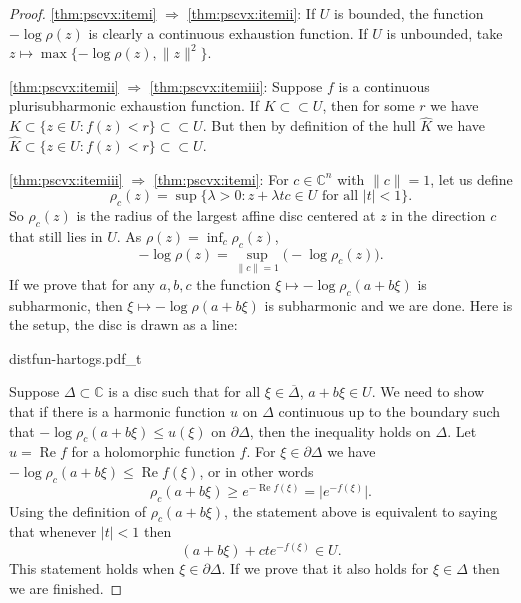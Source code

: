 \documentclass[12pt,openany]{book}
\renewcommand{\Re}{\operatorname{Re}}
\newcommand{\sabs}[1]{\lvert {#1} \rvert}
\newcommand{\snorm}[1]{\lVert {#1} \rVert}
\newcommand{\babs}[1]{\bigl\lvert {#1} \bigr\rvert}
\newcommand{\C}{{\mathbb{C}}}
\newcommand{\D}{{\mathbb{D}}}
\theoremstyle{plain}
\theoremstyle{remark}
\theoremstyle{definition}
\theoremstyle{exercise}
\theoremstyle{example}
\begin{document}
\begin{proof}
\eqref{thm:pscvx:itemi}
$\Rightarrow$
\eqref{thm:pscvx:itemii}:
If $U$ is bounded,
the function $-\log \rho(z)$ is clearly a continuous exhaustion function.
If $U$ is unbounded, take 
$z \mapsto \max \{ -\log \rho(z) , \snorm{z}^2 \}$.

\eqref{thm:pscvx:itemii}
$\Rightarrow$
\eqref{thm:pscvx:itemiii}:
Suppose $f$ is a continuous plurisubharmonic exhaustion function.
If $K \subset \subset U$, then for some $r$ we have
$K \subset \{ z \in U : f(z) < r \} \subset \subset U$.
But then by definition of the hull $\widehat{K}$ we have
$\widehat{K} \subset \{ z \in U : f(z) < r \} \subset \subset U$.

\eqref{thm:pscvx:itemiii}
$\Rightarrow$
\eqref{thm:pscvx:itemi}:
For $c \in \C^n$ with $\snorm{c}=1$, let us define
\begin{equation*}
\rho_c(z) =
\sup \{ \lambda > 0 : z+ \lambda t c \in U \text{ for all $\sabs{t} <
1$} \} .
\end{equation*}
So $\rho_c(z)$ is the radius of the largest affine disc centered at $z$
in the direction $c$ that still lies in $U$.
As $\rho(z) = \inf_c \rho_c(z)$,
\begin{equation*}
- \log \rho(z) = \sup_{\snorm{c}=1} \bigl(-\log \rho_c(z)\bigr) .
\end{equation*}
If we prove that for any $a, b, c$ the function $\xi \mapsto -\log \rho_c(a+b\xi)$ is
subharmonic, then $\xi \mapsto - \log \rho(a+b\xi)$ is subharmonic and we are done.
Here is the setup, the disc is drawn as a line:

\begin{center}
{distfun-hartogs.pdf_t}
\end{center}

Suppose $\Delta \subset \C$ is a disc such that for all $\xi \in
\overline{\Delta}$, $a+b\xi \in U$.  We need to show that if there is a
harmonic function $u$ on $\Delta$ continuous up to the boundary such
that $- \log \rho_c(a+b\xi) \leq u(\xi)$ on $\partial \Delta$, then
the inequality holds on $\Delta$.  Let $u = \Re f$ for a holomorphic
function $f$.
For $\xi \in \partial \Delta$ we have  $- \log \rho_c(a+b\xi) \leq \Re
f(\xi)$,
or in other words
\begin{equation*}
\rho_c(a+b\xi) \geq e^{-\Re f(\xi)} = \babs{e^{-f(\xi)}}.
\end{equation*}
Using the definition of $\rho_c(a+b\xi)$, the statement above is equivalent
to saying that whenever $\sabs{t} < 1$ then 
\begin{equation*}
(a+b\xi)+cte^{-f(\xi)} \in U .
\end{equation*}
This statement holds when $\xi \in \partial \Delta$.  If we prove that it also
holds for $\xi \in \Delta$ then we are finished.


\end{proof}
\end{document}
